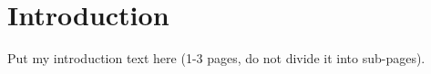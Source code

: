 \chapter*{Introduction \TODO}		 		 %

Put my introduction text here (1-3 pages, do not divide it into sub-pages).